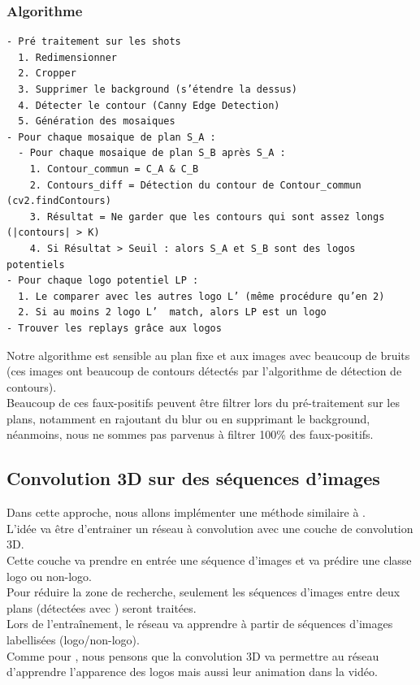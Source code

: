 \documentclass[11pt]{article}
\begin{document}
\subsubsection{Algorithme}
\label{sec:orgb0b01fc}
\begin{verbatim}
- Pré traitement sur les shots
  1. Redimensionner
  2. Cropper
  3. Supprimer le background (s’étendre la dessus)
  4. Détecter le contour (Canny Edge Detection)
  5. Génération des mosaiques
- Pour chaque mosaique de plan S_A :
  - Pour chaque mosaique de plan S_B après S_A :
    1. Contour_commun = C_A & C_B
    2. Contours_diff = Détection du contour de Contour_commun (cv2.findContours)
    3. Résultat = Ne garder que les contours qui sont assez longs (|contours| > K)
    4. Si Résultat > Seuil : alors S_A et S_B sont des logos potentiels
- Pour chaque logo potentiel LP :
  1. Le comparer avec les autres logo L’ (même procédure qu’en 2)
  2. Si au moins 2 logo L’  match, alors LP est un logo
- Trouver les replays grâce aux logos
\end{verbatim}

Notre algorithme est sensible au plan fixe et aux images avec beaucoup de bruits (ces images ont beaucoup de contours détectés par l’algorithme de détection de contours).\\
Beaucoup de ces faux-positifs peuvent être filtrer lors du pré-traitement sur les plans, notamment en rajoutant du blur ou en supprimant le background, néanmoins, nous ne sommes pas parvenus à filtrer 100\% des faux-positifs.\\

\subsection{Convolution 3D sur des séquences d'images}
\label{sec:orgfe1e19f}
Dans cette approche, nous allons implémenter une méthode similaire à \cite{Tran_2015}.\\
L'idée va être d'entrainer un réseau à convolution avec une couche de convolution 3D.\\
Cette couche va prendre en entrée une séquence d'images et va prédire une classe logo ou non-logo.\\
Pour réduire la zone de recherche, seulement les séquences d'images entre deux plans (détectées avec \cite{Abd_Almageed_2008}) seront traitées.\\
Lors de l'entraînement, le réseau va apprendre à partir de séquences d'images labellisées (logo/non-logo).\\
Comme pour \cite{Tran_2015}, nous pensons que la convolution 3D va permettre au réseau d'apprendre l'apparence des logos mais aussi leur animation dans la vidéo.\\
\end{document}
